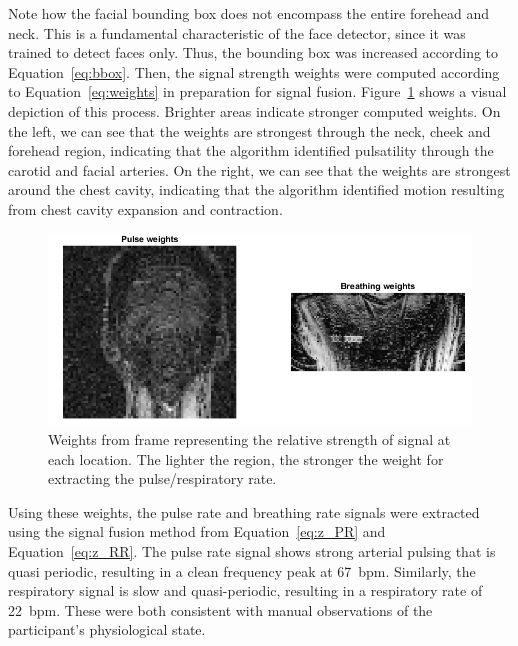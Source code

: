 \documentclass{article}
\begin{document}
Note how the facial bounding box does not encompass the entire forehead and neck. This is a fundamental characteristic of the face detector, since it was trained to detect faces only. Thus, the bounding box was increased according to Equation~\ref{eq:bbox}. Then, the signal strength weights were computed according to Equation~\ref{eq:weights} in preparation for signal fusion. Figure~\ref{fig:weights} shows a visual depiction of this process. Brighter areas indicate stronger computed weights. On the left, we can see that the weights are strongest through the neck, cheek and forehead region, indicating that the algorithm identified pulsatility through the carotid and facial arteries. On the right, we can see that the weights are strongest around the chest cavity, indicating that the algorithm identified motion resulting from chest cavity expansion and contraction.

\begin{figure}
\centering
\includegraphics[width=\textwidth]{Milestone2_Weights}
\caption{Weights from frame representing the relative strength of signal at each location. The lighter the region, the stronger the weight for extracting the pulse/respiratory rate.}
\label{fig:weights}
\end{figure}

Using these weights, the pulse rate and breathing rate signals were extracted using the signal fusion method from Equation~\ref{eq:z_PR} and Equation~\ref{eq:z_RR}. The pulse rate signal shows strong arterial pulsing that is quasi periodic, resulting in a clean frequency peak at 67~bpm. Similarly, the respiratory signal is slow and quasi-periodic, resulting in a respiratory rate of 22~bpm. These were both consistent with manual observations of the participant's physiological state.
\end{document}
